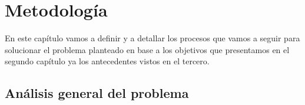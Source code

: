 \chapter{Metodología}

En este capítulo vamos a definir y a detallar los procesos que vamos a seguir para solucionar el problema planteado en base a los objetivos que presentamos en el segundo capítulo ya los antecedentes vistos en el tercero.

\section{Análisis general del problema}

\blindtext
